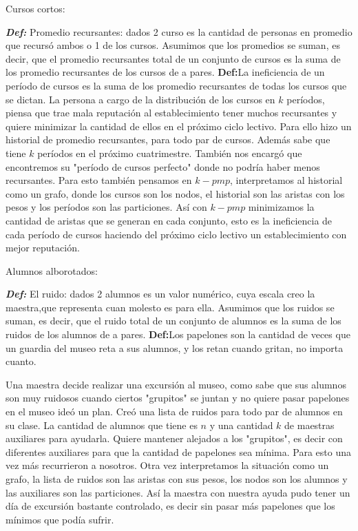 \documentclass[a4paper]{article}
\begin{document}
\begin{center}
Cursos cortos:
\end{center}
\textit{\textbf{Def:}} Promedio recursantes: dados 2 curso es la cantidad de personas en promedio que recursó ambos o 1 de los cursos. Asumimos que los promedios se suman, es decir, que el promedio recursantes total de un conjunto de cursos es la suma de los promedio recursantes de los cursos de a pares.\newline
\textbf{Def:}La ineficiencia de un período de cursos es la suma de los promedio recursantes de todas los cursos que se dictan.\newline 
La persona a cargo de la distribución de los cursos en $k$ períodos, piensa que trae mala reputación al establecimiento tener muchos recursantes y quiere minimizar la cantidad de ellos en el próximo ciclo lectivo. Para ello hizo un historial de promedio recursantes, para todo par de cursos. Además sabe que tiene $k$ períodos en el próximo cuatrimestre. \newline
También nos encargó que encontremos su "período de cursos perfecto" donde no podría haber menos recursantes.
Para esto también pensamos en $k-pmp$, interpretamos al historial como un grafo, donde los cursos son los nodos, el historial son las aristas con los pesos y los períodos son las particiones.
Así con $k-pmp$ minimizamos la cantidad de aristas que se generan en cada conjunto, esto es la ineficiencia de cada período de cursos haciendo del próximo ciclo lectivo un establecimiento con mejor reputación.\newline

\begin{center}
Alumnos alborotados:
\end{center}
\textit{\textbf{Def:}} El ruido: dados 2 alumnos es un valor numérico, cuya escala creo la maestra,que representa cuan molesto es para ella. Asumimos que los ruidos se suman, es decir, que el ruido total de un conjunto de alumnos es la suma de los ruidos de los alumnos de a pares.\newline
\textbf{Def:}Los papelones son la cantidad de veces que un guardia del museo reta a sus alumnos, y los retan cuando gritan, no importa cuanto.\newline 

Una maestra decide realizar una excursión al museo, como sabe que sus alumnos son muy ruidosos cuando ciertos "grupitos" se juntan y no quiere pasar papelones en el museo ideó un plan. Creó una lista de ruidos para todo par de alumnos en su clase. La cantidad de alumnos que tiene es $n$ y una cantidad $k$ de maestras auxiliares para ayudarla. Quiere mantener alejados a los "grupitos", es decir con diferentes auxiliares para que la cantidad de papelones sea mínima.\newline
Para esto una vez más recurrieron a nosotros. Otra vez interpretamos la situación como un grafo, la lista de ruidos son las aristas con sus pesos, los nodos son los alumnos y las auxiliares son las particiones. Así la maestra con nuestra ayuda pudo tener un día de excursión bastante controlado, es decir sin pasar más papelones que los mínimos que podía sufrir.
\end{document}

